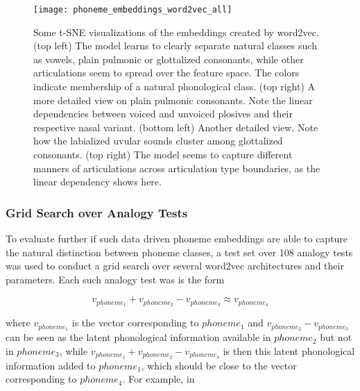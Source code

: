 \documentclass[6pt]{article}
\begin{document}
\begin{figure}[h!] %
   \centering
   \texttt{[image: phoneme\_embeddings\_word2vec\_all]} 
   \caption{Some t-SNE visualizations of the embeddings created by word2vec. (top left) The model learns to clearly separate natural classes such as vowels, plain pulmonic or glottalized consonants, while other articulations seem to spread over the feature space. The colors indicate membership of a natural phonological class.  (top right) A more detailed view on plain pulmonic consonants. Note the linear dependencies between voiced and unvoiced plosives and their respective nasal variant. (bottom left) Another detailed view. Note how the labialized uvular sounds cluster among glottalized consonants. (top right) The model seems to capture different manners of articulations across articulation type boundaries, as the linear dependency shows here.}
   \label{fig:phoneme_embeddings_word2vec_all}
\end{figure}

\subsubsection{Grid Search over Analogy Tests}
To evaluate further if such data driven phoneme embeddings are able to capture the natural distinction between phoneme classes, a test set over 108 analogy tests was used to conduct a grid search over several word2vec architectures and their parameters. Each such analogy test was is the form

\begin{equation}
v_{phoneme_1} + v_{phoneme_2} -  v_{phoneme_3} \approx v_{phoneme_4}
\end{equation} 

where $v_{phoneme_1}$ is the vector corresponding to $phoneme_1$ and $v_{phoneme_2} -  v_{phoneme_3}$ can be seen as the latent phonological information available in $phoneme_2$ but not in $phoneme_3$,  while $v_{phoneme_1} + v_{phoneme_2} -  v_{phoneme_3}$ is then this latent phonological information added to $phoneme_1$, which should be close to the vector corresponding to $phoneme_4$. For example, in
\end{document}
